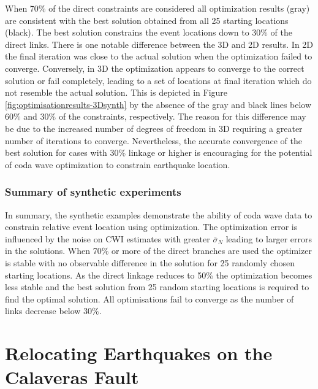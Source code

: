 \documentclass[extra, onecolumn, doublespacing]{gji}
\begin{document}
When 70\% of the direct constraints are considered all optimization
results (gray) are consistent with the best solution obtained from
all 25 starting locations (black). The
best solution constrains the event locations down to 30\% of the
direct links. There is one notable difference between the 3D and 2D results. In 2D
the final iteration was close to the actual solution when the
optimization failed to converge. Conversely, in 3D the optimization
appears to converge to the correct solution or fail completely,
leading to a set of locations at final iteration which do not
resemble the actual solution. This is depicted in Figure
\ref{fig:optimisationresults-3Dsynth} by the absence of the gray and
black lines below 60\% and 30\% of the constraints, respectively.
The reason for this difference may be due to the increased number of
degrees of freedom in 3D requiring a greater number of iterations to
converge. Nevertheless, the accurate convergence of the best
solution for cases with 30\% linkage or higher is encouraging for
the potential of coda wave optimization to constrain earthquake
location.

\subsubsection{Summary of synthetic experiments}

In summary, the synthetic examples demonstrate the ability of coda
wave data to constrain relative event location using optimization.
The optimization error is influenced by the noise on CWI estimates
with greater $\bar{\sigma}_N$ leading to larger errors in the
solutions. When 70\% or more of the direct branches are used the
optimizer is stable with no observable difference in the solution
for 25 randomly chosen starting locations. As the direct linkage
reduces to 50\% the optimization becomes less stable and the best
solution from 25 random starting locations is required to find the
optimal solution. All optimisations fail to converge as the number
of links decrease below 30\%.


\section{Relocating Earthquakes on the Calaveras Fault}
\label{sec:CalaverasLoc-CWIonly}
\end{document}
